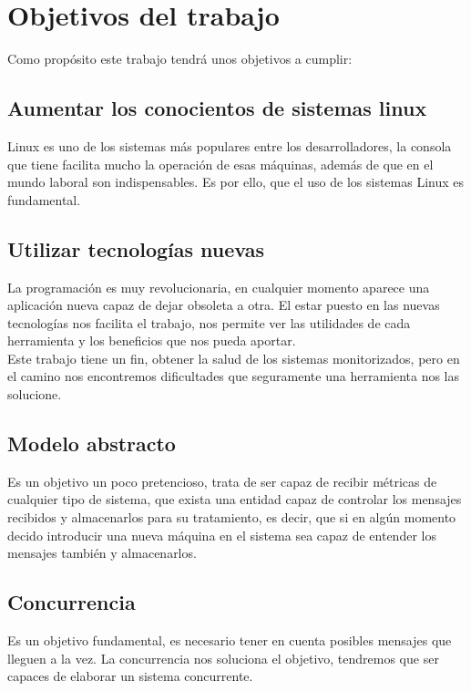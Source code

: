 \documentclass[ spanish, a4paper, 12pt, oneside]{report}
\begin{document}
\section{Objetivos del trabajo}
Como propósito este trabajo tendrá unos objetivos a cumplir:\\

\subsection{Aumentar los conocientos de sistemas linux}
Linux es uno de los sistemas más populares entre los desarrolladores, la consola que tiene facilita mucho la operación de esas 
máquinas, además de que en el mundo laboral son indispensables. Es por ello, que el uso de los sistemas Linux es fundamental.\\

\subsection{Utilizar tecnologías nuevas}
La programación es muy revolucionaria, en cualquier momento aparece una aplicación nueva capaz de dejar obsoleta a otra. 
El estar puesto en las nuevas tecnologías nos facilita el trabajo, nos permite ver las utilidades de cada herramienta y los
beneficios que nos pueda aportar. \\

Este trabajo tiene un fin, obtener la salud de los sistemas monitorizados, pero en el camino nos encontremos dificultades que 
seguramente una herramienta nos las solucione. \\

\subsection{Modelo abstracto}
Es un objetivo un poco pretencioso, trata de ser capaz de recibir métricas de cualquier tipo de sistema, que exista una entidad
capaz de controlar los mensajes recibidos y almacenarlos para su tratamiento, es decir, que si en algún momento decido introducir 
una nueva máquina en el sistema sea capaz de entender los mensajes también y almacenarlos. \\

\subsection{Concurrencia}
Es un objetivo fundamental, es necesario tener en cuenta posibles mensajes que lleguen a la vez. La concurrencia nos soluciona el 
objetivo, tendremos que ser capaces de elaborar un sistema concurrente.\\
\end{document}

